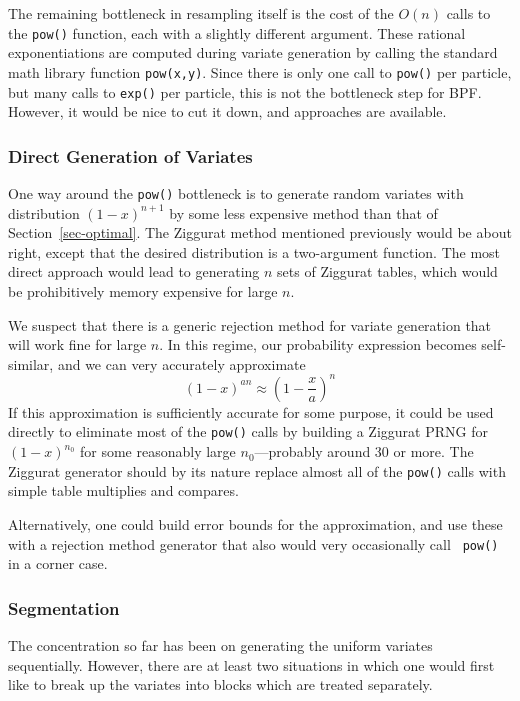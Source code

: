\documentclass[12pt]{article}
\begin{document}
  The remaining bottleneck in resampling itself is the cost
  of the $O(n)$ calls to the {\tt pow()} function, each with
  a slightly different argument.  These rational
  exponentiations are computed during variate generation by
  calling the standard math library function {\tt pow(x,y)}.
  Since there is only one call to {\tt pow()} per particle,
  but many calls to {\tt exp()} per particle, this is not
  the bottleneck step for BPF.  However, it would be nice to
  cut it down, and approaches are available.

\subsubsection{Direct Generation of Variates}

  One way around the {\tt pow()} bottleneck is to generate
  random variates with distribution $(1 - x)^{n + 1}$ by
  some less expensive method than that of
  Section~\ref{sec-optimal}.  The Ziggurat method mentioned
  previously would be about right, except that the desired
  distribution is a two-argument function.  The most direct
  approach would lead to generating $n$ sets of Ziggurat
  tables, which would be prohibitively memory expensive for
  large $n$.

  We suspect that there is a generic rejection method for
  variate generation that will work fine for large $n$. In
  this regime, our probability expression becomes
  self-similar, and we can very accurately approximate $$
    (1 - x)^{an} \approx \left(1 - \frac{x}{a}\right)^n
  $$
  If this approximation is sufficiently accurate for some
  purpose, it could be used directly to eliminate most
  of the {\tt pow()} calls by building a Ziggurat PRNG for
  $(1-x)^{n_0}$ for some reasonably large $n_0$---probably
  around 30 or more.  The Ziggurat generator should by its
  nature replace almost all of the {\tt pow()} calls with
  simple table multiplies and compares.

  Alternatively, one could build error bounds for the
  approximation, and use these with a rejection method
  generator that also would very occasionally call {\tt
  pow()} in a corner case.

\subsubsection{Segmentation}\label{sec-segment}

  The concentration so far has been on generating the
  uniform variates sequentially.  However, there are at
  least two situations in which one would first like to
  break up the variates into blocks which are treated
  separately.
\end{document}
